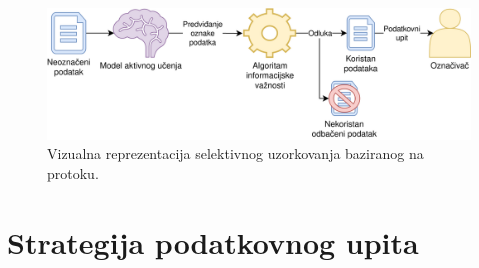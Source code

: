 \documentclass[times, utf8, zavrsni, numeric]{fer}
\begin{document}
\begin{enumerate}
    \begin{figure}[H]
    \centering
    \includegraphics[width=\textwidth]{pictures/stream.png}
    \caption{Vizualna reprezentacija selektivnog uzorkovanja baziranog na protoku. \citep{al_pictures}}
    \label{al_stream}
    \end{figure}
\end{enumerate}



\section{Strategija podatkovnog upita}
\end{document}
